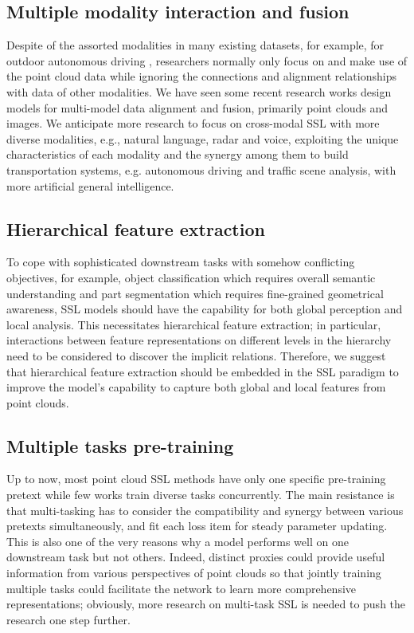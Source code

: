 \documentclass[a4paper,fleqn]{cas-dc}
\begin{document}
\subsection{Multiple modality interaction and fusion}
Despite of the assorted modalities in many existing datasets, for example, for outdoor autonomous driving \citep{geiger2012we,sun2020scalability,caesar2020nuscenes}, researchers normally only focus on and make use of the point cloud data while ignoring the connections and alignment relationships with data of other modalities. We have seen some recent research works design models \citep{vora2020pointpainting,wang2021pointaugmenting,li2022deepfusion} for multi-model data alignment and fusion, primarily point clouds and images. We anticipate more research to focus on cross-modal SSL with more diverse modalities, e.g., natural language, radar and voice, exploiting the unique characteristics of each modality and the synergy among them to build transportation systems, e.g. autonomous driving and traffic scene analysis, with more artificial general intelligence.


\subsection{Hierarchical feature extraction}
To cope with sophisticated downstream tasks with somehow conflicting objectives, for example, object classification which requires overall semantic understanding and part segmentation which requires fine-grained geometrical awareness, SSL models should have the capability for both global perception and local analysis. This necessitates hierarchical feature extraction; in particular, interactions between feature representations on different levels in the hierarchy need to be considered to discover the implicit relations. Therefore, we suggest that hierarchical feature extraction should be embedded in the SSL paradigm to improve the model's capability to capture both global and local features from point clouds.


\subsection{Multiple tasks pre-training}
Up to now, most point cloud SSL methods have only one specific pre-training pretext while few works train diverse tasks concurrently. The main resistance is that multi-tasking has to consider the compatibility and synergy between various pretexts simultaneously, and fit each loss item for steady parameter updating. This is also one of the very reasons why a model performs well on one downstream task but not others. Indeed, distinct proxies could provide useful information from various perspectives of point clouds so that jointly training multiple tasks could facilitate the network to learn more comprehensive representations; obviously, more research on multi-task SSL is needed to push the research one step further.
\end{document}
